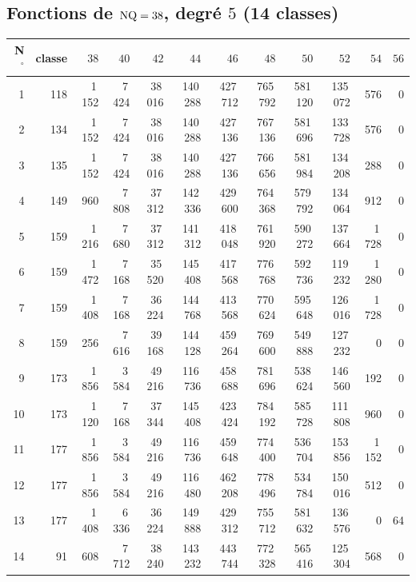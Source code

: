 \subsection{Fonctions de $\mathrm{NQ}=38$, degré $5$ (14 classes)}\label{tab:annexe38_5}
\begin{center}\footnotesize\setlength{\tabcolsep}{4pt}
\begin{longtable}{r r r r r r r r r r r r }
\toprule
N$^\circ$ & classe & $38$ & $40$ & $42$ & $44$ & $46$ & $48$ & $50$ & $52$ & $54$ & $56$\\
\midrule
\endhead
1 & 118 & 1\,152 & 7\,424 & 38\,016 & 140\,288 & 427\,712 & 765\,792 & 581\,120 & 135\,072 & 576 & 0 \\
2 & 134 & 1\,152 & 7\,424 & 38\,016 & 140\,288 & 427\,136 & 767\,136 & 581\,696 & 133\,728 & 576 & 0 \\
3 & 135 & 1\,152 & 7\,424 & 38\,016 & 140\,288 & 427\,136 & 766\,656 & 581\,984 & 134\,208 & 288 & 0 \\
4 & 149 & 960 & 7\,808 & 37\,312 & 142\,336 & 429\,600 & 764\,368 & 579\,792 & 134\,064 & 912 & 0 \\
5 & 159 & 1\,216 & 7\,680 & 37\,312 & 141\,312 & 418\,048 & 761\,920 & 590\,272 & 137\,664 & 1\,728 & 0 \\
6 & 159 & 1\,472 & 7\,168 & 35\,520 & 145\,408 & 417\,568 & 776\,768 & 592\,736 & 119\,232 & 1\,280 & 0 \\
7 & 159 & 1\,408 & 7\,168 & 36\,224 & 144\,768 & 413\,568 & 770\,624 & 595\,648 & 126\,016 & 1\,728 & 0 \\
8 & 159 & 256 & 7\,616 & 39\,168 & 144\,128 & 459\,264 & 769\,600 & 549\,888 & 127\,232 & 0 & 0 \\
9 & 173 & 1\,856 & 3\,584 & 49\,216 & 116\,736 & 458\,688 & 781\,696 & 538\,624 & 146\,560 & 192 & 0 \\
10 & 173 & 1\,120 & 7\,168 & 37\,344 & 145\,408 & 423\,424 & 784\,192 & 585\,728 & 111\,808 & 960 & 0 \\
11 & 177 & 1\,856 & 3\,584 & 49\,216 & 116\,736 & 459\,648 & 774\,400 & 536\,704 & 153\,856 & 1\,152 & 0 \\
12 & 177 & 1\,856 & 3\,584 & 49\,216 & 116\,480 & 462\,208 & 778\,496 & 534\,784 & 150\,016 & 512 & 0 \\
13 & 177 & 1\,408 & 6\,336 & 36\,224 & 149\,888 & 429\,312 & 755\,712 & 581\,632 & 136\,576 & 0 & 64 \\
14 & 91 & 608 & 7\,712 & 38\,240 & 143\,232 & 443\,744 & 772\,328 & 565\,416 & 125\,304 & 568 & 0 \\
\bottomrule
\end{longtable}
\end{center}
